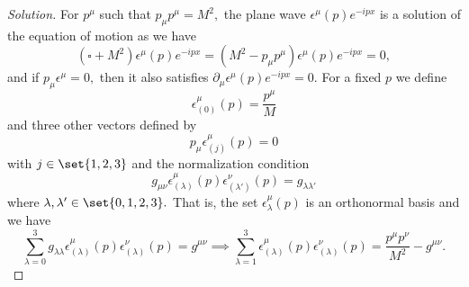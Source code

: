\begin{proof}[Solution]
   For \(p^\mu\) such that \(p_\mu p^\mu = M^2,\) the plane wave \(\epsilon^{\mu}(p) e^{-ipx}\) is a solution of the equation of motion as we have
   \begin{equation*}
      (\square + M^2) \epsilon^{\mu}(p) e^{-ipx} = (M^2-p_\mu p^\mu) \epsilon^{\mu}(p) e^{-ipx} = 0,
   \end{equation*}
   and if \(p_\mu \epsilon^\mu = 0,\) then it also satisfies \(\partial_\mu \epsilon^\mu(p) e^{-ipx} = 0.\) For a fixed \(p\) we define
   \begin{equation*}
      \epsilon^{\mu}_{(0)}(p) = \frac{p^\mu}{M}
   \end{equation*}
   and three other vectors defined by
   \begin{equation*}
      p_\mu \epsilon^{\mu}_{(j)}(p) = 0
   \end{equation*}
   with \(j \in \set{1,2,3}\) and the normalization condition
   \begin{equation*}
      g_{\mu\nu} \epsilon^{\mu}_{(\lambda)}(p) \epsilon^{\nu}_{(\lambda')}(p) = g_{\lambda \lambda'}
   \end{equation*}
   where \(\lambda, \lambda' \in \set{0,1,2,3}.\) That is, the set \(\epsilon^{\mu}_{\lambda}(p)\) is an orthonormal basis and we have
   \begin{equation*}
      \sum_{\lambda = 0}^3 g_{\lambda \lambda} \epsilon_{(\lambda)}^\mu (p) \epsilon_{(\lambda)}^\nu(p) = g^{\mu\nu} \implies
      \sum_{\lambda = 1}^3 \epsilon^{\mu}_{(\lambda)}(p) \epsilon^{\nu}_{(\lambda)}(p) = \frac{p^\mu p^\nu}{M^2}-g^{\mu\nu}.
   \end{equation*}


\end{proof}
